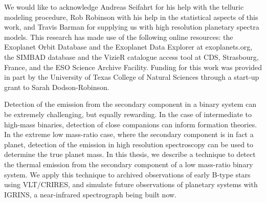 \documentclass[11pt]{report}     %
\begin{document}
\thesiscopyrightpage                 %
\thesissignaturepage              %
\thesistitlepage                     %

  \begin{thesisacknowledgments}        %
    
We would like to acknowledge Andreas Seifahrt for his help with the
telluric modeling procedure, Rob Robinson with his help in the
statistical aspects of this work, and Travis Barman for supplying us
with high resolution planetary spectra models. This  research has made use of the 
following online resources: the Exoplanet Orbit Database
and the Exoplanet Data Explorer at exoplanets.org, the SIMBAD database and the VizieR
catalogue access tool at CDS, Strasbourg, France, and the ESO Science 
Archive Facility. Funding for this work was provided in part by the University
of Texas College of Natural Sciences through a start-up grant to Sarah Dodson-Robinson.

  
\end{thesisacknowledgments}

\begin{thesisabstract}               %
Detection of the emission from the secondary component in a binary system can be extremely challenging, but equally rewarding. In the case of intermediate to high-mass binaries, detection of close companions can inform formation theories. In the extreme low mass-ratio case, where the secondary component is in fact a planet, detection of the emission in high resolution spectroscopy can be used to determine the true planet mass. In this thesis, we describe a technique to detect the thermal emission from the secondary component of a low mass-ratio binary system. We apply this technique to archived observations of early B-type stars using VLT/CRIRES, and simulate future observations of planetary systems with IGRINS, a near-infrared spectrograph being built now. 
\end{thesisabstract}
\end{document}
